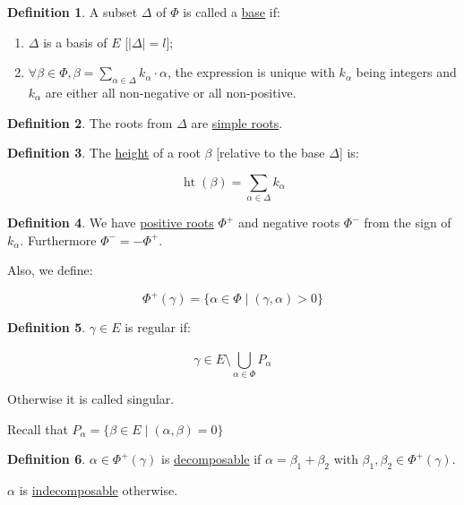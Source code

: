 \documentclass{article}
\theoremstyle{definition}
\newtheorem*{definition}{Definition}
\begin{document}
\begin{definition}
    A subset \(\Delta\) of \(\Phi\) is called a \underline{base} if:

    \begin{enumerate}[label=B\arabic*)]
        \item \(\Delta\) is a basis of \(E\) [\(\vert \Delta \vert = l\)];
        \item \(\forall \beta \in \Phi , \beta = \sum_{\alpha \in \Delta} k_\alpha \cdot \alpha\), the expression is unique with \(k_\alpha\) being integers and \(k_\alpha\) are either all non-negative or all non-positive. 
    \end{enumerate} 
\end{definition}

\begin{definition}
    The roots from \(\Delta\) are \underline{simple roots}.
\end{definition}

\begin{definition}
    The \underline{height} of a root \(\beta\) [relative to the base \(\Delta\)] is:

    \[
        \operatorname{ht} (\beta) = \sum_{\alpha \in \Delta} k_\alpha
    \]
\end{definition}

\begin{definition}
    We have \underline{positive roots} \(\Phi^+\) and negative roots \(\Phi^-\) from the sign of \(k_\alpha\). Furthermore \(\Phi^- = - \Phi^+\).

    Also, we define:

    \[
        \Phi^+(\gamma) = \{ \alpha \in \Phi \mid (\gamma , \alpha) > 0 \}
    \]
\end{definition}


\begin{definition}
    \(\gamma \in E\) is regular if:

    \[
        \gamma \in E \setminus \bigcup_{\alpha \in \Phi}^{} P_\alpha
    \]

    Otherwise it is called singular.

    Recall that \(P_\alpha =\{ \beta \in E \mid (\alpha ,\beta) = 0 \}\)
\end{definition}

\begin{definition}
    \(\alpha \in \Phi^+(\gamma)\) is \underline{decomposable} if \(\alpha = \beta_1 + \beta_2\) with \(\beta_1, \beta_2 \in \Phi^+(\gamma)\). 
    
    \(\alpha\) is \underline{indecomposable} otherwise.
\end{definition}
\end{document}
